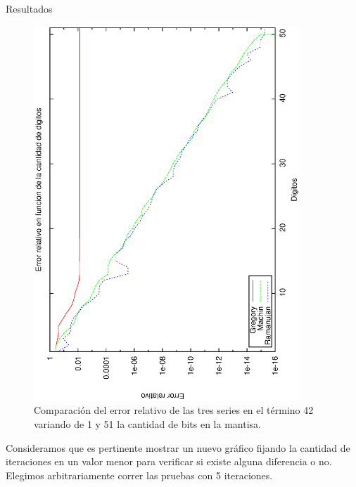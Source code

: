 \begin{section}{Resultados}
	\begin{figure}[H]
	  \centering
		\includegraphics[width=10cm,angle=-90]{graficos/comparacion_42it_1a51p.eps}
	  \caption{Comparación del error relativo de las tres series en el término 42 variando de 1 y 51 la cantidad de bits en la mantisa.}
	  \label{fig:42it}
	\end{figure}
	
	\VSP
	
	Consideramos que es pertinente mostrar un nuevo gráfico fijando la cantidad de iteraciones en un valor menor para verificar si existe alguna diferencia o no. Elegimos arbitrariamente correr las pruebas con 5 iteraciones.
	

\end{section}
